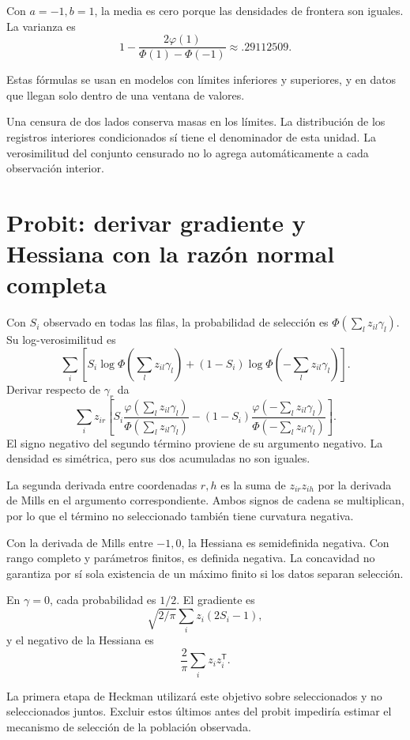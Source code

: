 \documentclass[11pt,a4paper]{article}
\newcommand{\T}{^{\mathsf T}}
\begin{document}
\begin{ejemplo}
Con \(a=-1,b=1\), la media es cero
porque las densidades de frontera
son iguales. La varianza es
\[
1-\frac{2\varphi(1)}{\Phi(1)-\Phi(-1)}
\approx.29112509.
\]
\end{ejemplo}
Estas fórmulas se usan en modelos
con límites inferiores y superiores,
y en datos que llegan solo
dentro de una ventana de valores.

Una censura de dos lados
conserva masas en los límites.
La distribución de los registros
interiores condicionados sí tiene
el denominador de esta unidad.
La verosimilitud del conjunto censurado
no lo agrega automáticamente
a cada observación interior.

\clearpage
\section{Probit: derivar gradiente y Hessiana con la razón normal completa}\label{unidad77}
Con \(S_i\) observado en todas las filas,
la probabilidad de selección es
\(\Phi(\sum_lz_{il}\gamma_l)\).
Su log-verosimilitud es
\[
\sum_i\left[
S_i\log\Phi(\sum_lz_{il}\gamma_l)
+(1-S_i)\log\Phi(-\sum_lz_{il}\gamma_l)\right].
\]
Derivar respecto de \(\gamma_r\) da
\[
\sum_i z_{ir}\left[
S_i\frac{\varphi(\sum_lz_{il}\gamma_l)}
{\Phi(\sum_lz_{il}\gamma_l)}
-(1-S_i)\frac{\varphi(-\sum_lz_{il}\gamma_l)}
{\Phi(-\sum_lz_{il}\gamma_l)}
\right].
\]
El signo negativo del segundo término
proviene de su argumento negativo.
La densidad es simétrica,
pero sus dos acumuladas no son iguales.

La segunda derivada entre coordenadas \(r,h\)
es la suma de \(z_{ir}z_{ih}\)
por la derivada de Mills
en el argumento correspondiente.
Ambos signos de cadena se multiplican,
por lo que el término no seleccionado
también tiene curvatura negativa.

Con la derivada de Mills entre \(-1,0\),
la Hessiana es semidefinida negativa.
Con rango completo y parámetros finitos,
es definida negativa.
La concavidad no garantiza por sí sola
existencia de un máximo finito
si los datos separan selección.

\begin{ejemplo}
En \(\gamma=0\), cada probabilidad es \(1/2\).
El gradiente es
\[
\sqrt{2/\pi}\sum_i z_i(2S_i-1),
\]
y el negativo de la Hessiana es
\[
\frac2\pi\sum_i z_iz_i\T.
\]
\end{ejemplo}
La primera etapa de Heckman utilizará
este objetivo sobre seleccionados
y no seleccionados juntos.
Excluir estos últimos antes del probit
impediría estimar el mecanismo
de selección de la población observada.
\end{document}
